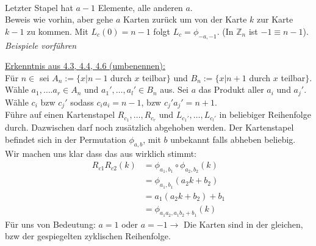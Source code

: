 \documentclass[a4paper]{article}
\begin{document}
\begin{beweis}
\begin{itemize}
\begin{figure}[htbp]
\end{figure} \\
Letzter Stapel hat $a-1$ Elemente, alle anderen $a$. \\
Beweis wie vorhin, aber gehe $a$ Karten zurück um von der Karte $k$ zur Karte $k-1$ zu kommen. Mit $L_c(0) = n-1$ folgt $L_c = \phi_{-a,-1}$. (In $\mathbb{Z}_n$ ist $-1\equiv n-1$). \\
    \textit{Beispiele vorführen}
    \end{itemize}
    \end {beweis}
    \underline{Erkenntnis aus 4.3, 4.4, 4.6 (umbenennen):} \\
    Für $n \in $  sei $A_n := \lbrace x \big\vert n-1$ durch $x$ teilbar$\rbrace$ und $B_n := \lbrace x \big\vert n+1$ durch $x$ teilbar$\rbrace$. \\
    Wähle $a_1, …. a_r \in A_n$ und $a_1', …, a_l' \in B_n$ aus. Sei $a$ das Produkt aller $a_i$ und $a_j'$. Wähle $c_i$ bzw $c_j'$ sodass $c_ia_i = n-1$, bzw $c_j'a_j' = n+1$. \\
    Führe auf einen Kartenstapel $R_{c_1}, …, R_{c_r}$ und $L_{c_1'}, …, L_{c_l'}$ in beliebiger Reihenfolge durch. Dazwischen darf noch zusätzlich abgehoben werden. Der Kartenstapel befindet sich in der Permutation $\phi_{a,b}$, mit $b$ unbekannt falls abheben beliebig. \\
    Wir machen uns klar dass das aus wirklich stimmt: \\
    \begin{align*}
        	R_{c1}R_{c2}(k) &= \phi_{a_1, b_1}  \circ \phi_{a_2, b_2}(k) \\
        	& = \phi_{a_1, b_1}(a_2k + b_2) \\
        	& = a_1(a_2k + b_2) + b_1 \\
        	& = \phi_{a_1a_2, a_1b_2+b_1}(k)
    \end{align*}
    Für uns von Bedeutung: $a=1$ oder $a=-1 \rightarrow$ Die Karten sind in der gleichen, bzw der gespiegelten zyklischen Reihenfolge.
\end{document}
